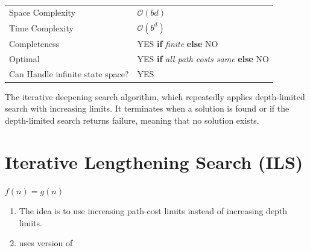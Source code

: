 \vspace{0.5cm}

\begin{customTableWrapper}{1.2}
\begin{longtable}{p{3cm} p{6cm}}
    Space Complexity & $\mathcal{O}(bd)$ \\

    Time Complexity & $\mathcal{O}(b^d)$ \\

    \hline

    Completeness & YES \textbf{if} \textit{finite} \textbf{else} NO \\

    Optimal & YES \textbf{if} \textit{all path costs same} \textbf{else} NO \\

    Can Handle infinite state space? & YES \\
\end{longtable}
\end{customTableWrapper}

\begin{algorithm}[H]
\caption{The iterative deepening search algorithm, which repeatedly applies depth-limited search with increasing limits. It terminates when a solution is found or if the depth-limited search returns failure, meaning that no solution exists.}

\end{algorithm}




\section{Iterative Lengthening Search (ILS) \cite{aci-1}} \label{Iterative Lengthening Search (ILS)}

\begin{center}
    $f(n) = g(n)$
\end{center}

\begin{enumerate}
    \item The idea is to use increasing path-cost limits instead of increasing depth limits.

    \item uses  version of 
\end{enumerate}


